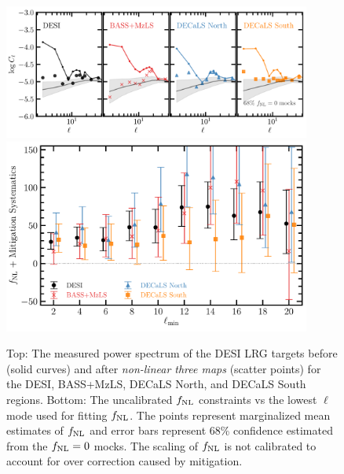 \begin{figure}
    \centering
    \includegraphics[width=0.9\textwidth]{figures/cldr9_lowell.pdf}
    \includegraphics[width=0.9\textwidth]{figures/fnl_elmin.pdf}  
    \caption{Top: The measured power spectrum of the DESI LRG targets before (solid curves) and after \textit{non-linear three maps} (scatter points) for the DESI, BASS+MzLS, DECaLS North, and DECaLS South regions. Bottom: The uncalibrated $f_{\rm NL}$ constraints vs the lowest $\ell$ mode used for fitting $f_{\rm NL}$. The points represent marginalized mean estimates of $f_{\rm NL}$ and error bars represent $68$\% confidence estimated from the $f_{\rm NL}=0$ mocks. The scaling of $f_{\rm NL}$ is not calibrated to account for over correction caused by mitigation.}\label{fig:mcmc_dr9elmin}
\end{figure}